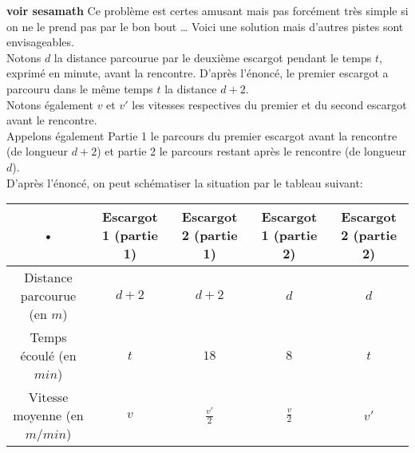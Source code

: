 \documentclass[10pt]{article}
\begin{document}
{\newpage 
\begin{Exo}\textbf{voir sesamath}
Ce problème est certes amusant mais pas forcément très simple si on ne le prend pas par le bon bout \ldots{} Voici une solution mais d'autres pistes sont envisageables.\\
Notons $d$ la distance parcourue par le deuxième escargot pendant le temps $t$, exprimé en minute, avant la rencontre. D'après l'énoncé, le premier escargot a parcouru dans le même temps $t$ la distance $d+2$.\\
Notons également $v$ et $v'$ les vitesses respectives du premier et du second escargot avant le rencontre.\\ 
Appelons également \og Partie 1 \fg{} le parcours du premier escargot avant la rencontre (de longueur $d+2$) et \og partie 2 \fg{} le parcours restant après le rencontre (de longueur $d$).\\
D'après l'énoncé, on peut schématiser la situation par le tableau suivant:\\
\begin{tabular}{|c|c|c|c|c|}
\hline 
• & Escargot 1 (partie 1) & Escargot 2 (partie 1) & Escargot 1 (partie 2) & Escargot 2 (partie 2) \\ 
\hline 
Distance parcourue (en $m$) & $d+2$ & $d+2$ & $d$ & $d$ \\ 
\hline 
Temps écoulé (en $min$) & $t$ & $18$ & $8$ & $t$ \\ 
\hline 
Vitesse moyenne (en $m/min$) & $v$ & $\frac{v'}{2}$ & $\frac{v}{2}$ & $v'$ \\ 

\end{tabular}
\end{Exo}}
\end{document}

